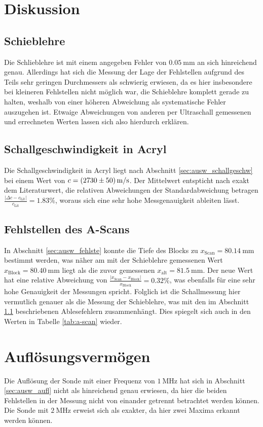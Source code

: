 \section{Diskussion}
\subsection{Schieblehre}
\label{sec:disk_schieb}
Die Schlieblehre ist mit einem angegeben Fehler von $\qty[]{0.05}{\milli\meter}$ an sich hinreichend genau.
Allerdings hat sich die Messung der Lage der Fehlstellen aufgrund des Teils sehr geringen Durchmessers als schwierig erwiesen, 
da es hier insbesondere bei kleineren Fehlstellen nicht möglich war, die Schieblehre komplett gerade zu halten,
weshalb von einer höheren Abweichung als systematische Fehler auszugehen ist.
Etwaige Abweichungen von anderen per Ultraschall gemessenen und errechneten Werten lassen sich also hierdurch erklären.

\subsection{Schallgeschwindigkeit in Acryl}
Die Schallgeschwindigkeit in Acryl liegt nach Abschnitt \ref{sec:ausw_schallgeschw} bei einem Wert von $c = \qty{2730 +- 50}{\meter\per\second}$.
Der Mittelwert entspticht nach \cite[]{schall-acryl} exakt dem Literaturwert, die relativen Abweichungen der Standardabweichung betragen
$\frac{|\Delta c - c_\text{Lit}|}{c_\text{Lit}} = \num{1.83} \%$, woraus sich eine sehr hohe Messgenauigkeit ableiten lässt.

\subsection{Fehlstellen des A-Scans}
In Abschnitt \ref{sec:ausw_fehlste} konnte die Tiefe des Blocks zu $x_\text{Scan} = \qty{80.14}{\mm}$ bestimmt werden, 
was näher am mit der Schieblehre gemessenen Wert $x_\text{Block} = \qty{80.40}{\mm}$ liegt als die zuvor gemessenen $x_\text{alt} = \qty{81.5}{\mm}$.
Der neue Wert hat eine relative Abweichung von $\frac{|x_\text{Scan} - x_\text{Block}|}{x_\text{Block}} = \num{0.32} \%$,
was ebenfalls für eine sehr hohe Genauigkeit der Messungen spricht.
Folglich ist die Schallmessung hier vermutlich genauer als die Messung der Schieblehre, was mit den im Abschnitt \ref{sec:disk_schieb}
beschriebenen Ablesefehlern zusammenhängt.
Dies spiegelt sich auch in den Werten in Tabelle \ref{tab:a-scan} wieder.

\section{Auflösungsvermögen}
Die Auflösung der Sonde mit einer Frequenz von $\qty[]{1}{\mega\hertz}$ hat sich in Abschnitt \ref{sec:ausw_aufl} nicht als hinreichend 
genau erwiesen, da hier die beiden Fehlstellen in der Messung nicht von einander getrennt betrachtet werden können.
Die Sonde mit $\qty[]{2}{\mega\hertz}$ erweist sich als exakter, da hier zwei Maxima erkannt werden können.

